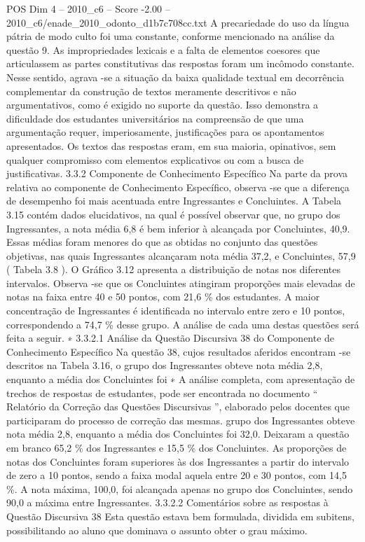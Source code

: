 \begin{textsample}{POS Dim 4 – 2010\_c6 – Score -2.00 – 2010\_c6/enade\_2010\_odonto\_d1b7c708cc.txt}
A precariedade do uso da língua pátria de modo culto foi uma constante, conforme mencionado na análise da questão 9.
As impropriedades lexicais e a falta de elementos coesores que articulassem as partes constitutivas das respostas foram um incômodo constante.
Nesse sentido, agrava -se a situação da baixa qualidade textual em decorrência complementar da construção de textos meramente descritivos e não argumentativos, como é exigido no suporte da questão.
Isso demonstra a dificuldade dos estudantes universitários na compreensão de que uma argumentação requer, imperiosamente, justificações para os apontamentos apresentados.
Os textos das respostas eram, em sua maioria, opinativos, sem qualquer compromisso com elementos explicativos ou com a busca de justificativas. 3.3.2 Componente de Conhecimento Específico Na parte da prova relativa ao componente de Conhecimento Específico, observa -se que a diferença de desempenho foi mais acentuada entre Ingressantes e Concluintes.
A Tabela 3.15 contém dados elucidativos, na qual é possível observar que, no grupo dos Ingressantes, a nota média 6,8 é bem inferior à alcançada por Concluintes, 40,9.
Essas médias foram menores do que as obtidas no conjunto das questões objetivas, nas quais Ingressantes alcançaram nota média 37,2, e Concluintes, 57,9 ( Tabela 3.8 ).
O Gráfico 3.12 apresenta a distribuição de notas nos diferentes intervalos.
Observa -se que os Concluintes atingiram proporções mais elevadas de notas na faixa entre 40 e 50 pontos, com 21,6 \% dos estudantes.
A maior concentração de Ingressantes é identificada no intervalo entre zero e 10 pontos, correspondendo a 74,7 \% desse grupo.
A análise de cada uma destas questões será feita a seguir. ∗ 3.3.2.1 Análise da Questão Discursiva 38 do Componente de Conhecimento Específico Na questão 38, cujos resultados aferidos encontram -se descritos na Tabela 3.16, o grupo dos Ingressantes obteve nota média 2,8, enquanto a média dos Concluintes foi ∗ A análise completa, com apresentação de trechos de respostas de estudantes, pode ser encontrada no documento “ Relatório da Correção das Questões Discursivas ”, elaborado pelos docentes que participaram do processo de correção das mesmas. grupo dos Ingressantes obteve nota média 2,8, enquanto a média dos Concluintes foi 32,0.
Deixaram a questão em branco 65,2 \% dos Ingressantes e 15,5 \% dos Concluintes.
As proporções de notas dos Concluintes foram superiores às dos Ingressantes a partir do intervalo de zero a 10 pontos, sendo a faixa modal aquela entre 20 e 30 pontos, com 14,5 \%.
A nota máxima, 100,0, foi alcançada apenas no grupo dos Concluintes, sendo 90,0 a máxima entre Ingressantes. 3.3.2.2 Comentários sobre as respostas à Questão Discursiva 38 Esta questão estava bem formulada, dividida em subitens, possibilitando ao aluno que dominava o assunto obter o grau máximo.

\end{textsample}
